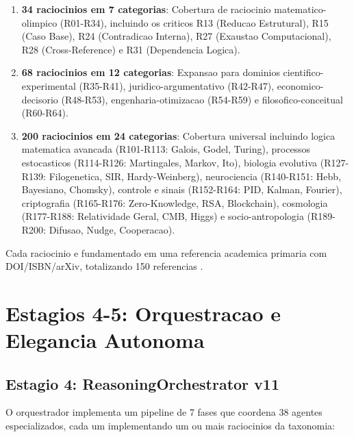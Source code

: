 \documentclass[5p]{elsarticle}
\begin{document}
\begin{enumerate}[label=Onda \arabic*:]
  \item \textbf{34 raciocinios em 7 categorias}: Cobertura de raciocinio
    matematico-olimpico (R01-R34), incluindo os criticos R13 (Reducao Estrutural),
    R15 (Caso Base), R24 (Contradicao Interna), R27 (Exaustao Computacional),
    R28 (Cross-Reference) e R31 (Dependencia Logica).
  \item \textbf{68 raciocinios em 12 categorias}: Expansao para dominios
   cientifico-experimental (R35-R41), juridico-argumentativo (R42-R47),
   economico-decisorio (R48-R53), engenharia-otimizacao (R54-R59) e
   filosofico-conceitual (R60-R64).
  \item \textbf{200 raciocinios em 24 categorias}: Cobertura universal incluindo
   logica matematica avancada (R101-R113: Galois, Godel, Turing), processos
   estocasticos (R114-R126: Martingales, Markov, Ito), biologia evolutiva
   (R127-R139: Filogenetica, SIR, Hardy-Weinberg), neurociencia (R140-R151:
   Hebb, Bayesiano, Chomsky), controle e sinais (R152-R164: PID, Kalman,
   Fourier), criptografia (R165-R176: Zero-Knowledge, RSA, Blockchain),
   cosmologia (R177-R188: Relatividade Geral, CMB, Higgs) e socio-antropologia
   (R189-R200: Difusao, Nudge, Cooperacao).
\end{enumerate}

Cada raciocinio e fundamentado em uma referencia academica primaria com
DOI/ISBN/arXiv, totalizando 150 referencias \cite{taxonomia200}.

\section{Estagios 4-5: Orquestracao e Elegancia Autonoma}

\subsection{Estagio 4: ReasoningOrchestrator v11}

O orquestrador implementa um pipeline de 7 fases que coordena 38 agentes
especializados, cada um implementando um ou mais raciocinios da taxonomia:
\end{document}
